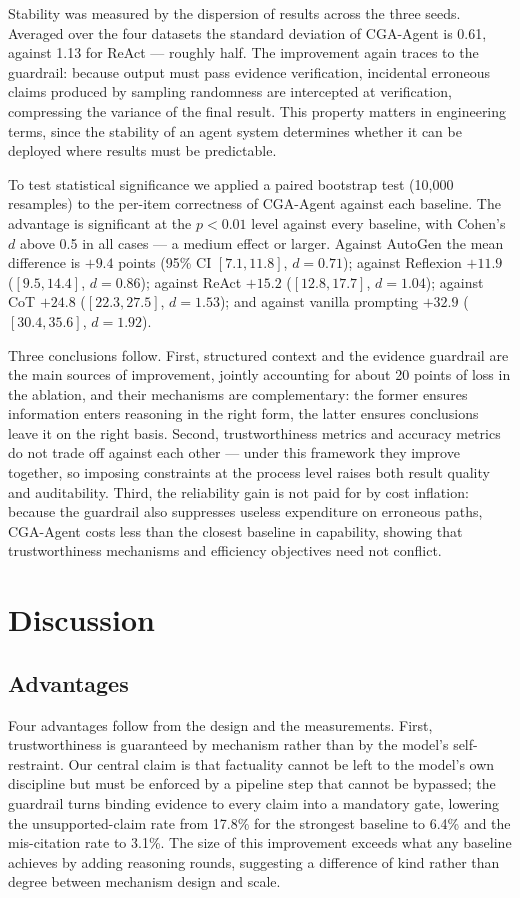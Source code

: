 \documentclass[journal,10pt,a4paper]{IEEEtran}
\begin{document}
Stability was measured by the dispersion of results across the three seeds. Averaged over the four datasets the standard deviation of CGA-Agent is 0.61, against 1.13 for ReAct --- roughly half. The improvement again traces to the guardrail: because output must pass evidence verification, incidental erroneous claims produced by sampling randomness are intercepted at verification, compressing the variance of the final result. This property matters in engineering terms, since the stability of an agent system determines whether it can be deployed where results must be predictable.

To test statistical significance we applied a paired bootstrap test (10,000 resamples) to the per-item correctness of CGA-Agent against each baseline. The advantage is significant at the $p<0.01$ level against every baseline, with Cohen's $d$ above 0.5 in all cases --- a medium effect or larger. Against AutoGen the mean difference is $+9.4$ points (95\% CI $[7.1, 11.8]$, $d=0.71$); against Reflexion $+11.9$ ($[9.5, 14.4]$, $d=0.86$); against ReAct $+15.2$ ($[12.8, 17.7]$, $d=1.04$); against CoT $+24.8$ ($[22.3, 27.5]$, $d=1.53$); and against vanilla prompting $+32.9$ ($[30.4, 35.6]$, $d=1.92$).

Three conclusions follow. First, structured context and the evidence guardrail are the main sources of improvement, jointly accounting for about 20 points of loss in the ablation, and their mechanisms are complementary: the former ensures information enters reasoning in the right form, the latter ensures conclusions leave it on the right basis. Second, trustworthiness metrics and accuracy metrics do not trade off against each other --- under this framework they improve together, so imposing constraints at the process level raises both result quality and auditability. Third, the reliability gain is not paid for by cost inflation: because the guardrail also suppresses useless expenditure on erroneous paths, CGA-Agent costs less than the closest baseline in capability, showing that trustworthiness mechanisms and efficiency objectives need not conflict.

\section{Discussion}
\label{sec:discussion}
\subsection{Advantages}
Four advantages follow from the design and the measurements. First, trustworthiness is guaranteed by mechanism rather than by the model's self-restraint. Our central claim is that factuality cannot be left to the model's own discipline but must be enforced by a pipeline step that cannot be bypassed; the guardrail turns binding evidence to every claim into a mandatory gate, lowering the unsupported-claim rate from 17.8\% for the strongest baseline to 6.4\% and the mis-citation rate to 3.1\%. The size of this improvement exceeds what any baseline achieves by adding reasoning rounds, suggesting a difference of kind rather than degree between mechanism design and scale.
\end{document}
